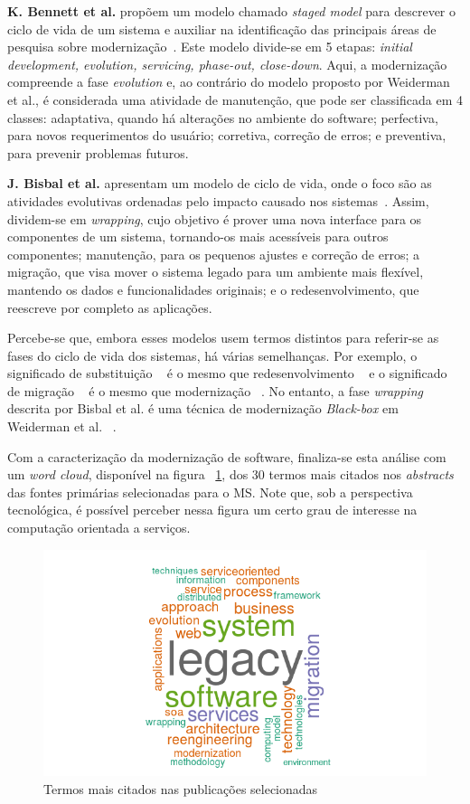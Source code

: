 \textbf{K. Bennett et al.} propõem um modelo chamado 
\textit{staged model} para descrever o ciclo de vida de um sistema e auxiliar na identificação das principais 
áreas de pesquisa sobre modernização~\cite{S01_bennett2000software}. Este modelo divide-se em 5 etapas: 
\textit{initial development, evolution, servicing, phase-out, close-down}. Aqui, a modernização compreende a fase \textit{evolution} e, 
ao contrário do modelo proposto por Weiderman et al., é considerada uma atividade de manutenção, que pode ser classificada em 
4 classes: adaptativa, quando há alterações no ambiente do software; perfectiva, para novos requerimentos do usuário; corretiva, correção de erros; e preventiva, para 
prevenir problemas futuros. 

\textbf{J. Bisbal et al.} apresentam um modelo de ciclo de vida, onde o foco são as atividades evolutivas ordenadas pelo impacto causado nos 
sistemas~\cite{S3_Bisbal:1999}. Assim, dividem-se em \textit{wrapping}, cujo objetivo é prover uma nova interface para os componentes de um sistema, 
tornando-os mais acessíveis para outros componentes; manutenção, para os pequenos ajustes e correção de erros; a migração, que visa mover o sistema 
legado para um ambiente mais flexível, mantendo os dados e funcionalidades originais; e o redesenvolvimento, que reescreve por completo as aplicações. 

Percebe-se que, embora esses modelos usem termos distintos para referir-se as fases do ciclo de vida dos sistemas, há várias semelhanças. Por exemplo, 
o significado de substituição ~\cite{S15_Comella-DordaASurvey2000, Seacord:2003, S12_WeidermanApproaches:1997} é o mesmo que redesenvolvimento ~\cite{S3_Bisbal:1999} e o significado de migração ~\cite{S3_Bisbal:1999} é o mesmo que modernização ~\cite{S15_Comella-DordaASurvey2000, Seacord:2003, S12_WeidermanApproaches:1997}. No entanto, 
a fase \textit{wrapping} descrita por Bisbal et al. é uma técnica de modernização \textit{Black-box} em Weiderman et al. ~\cite{S15_Comella-DordaASurvey2000, Seacord:2003, S12_WeidermanApproaches:1997}.

Com a caracterização da modernização de software, finaliza-se esta análise com um \textit{word cloud}, disponível na figura ~\ref{fig:word_cloud}, dos 30 termos mais citados nos \textit{abstracts} das fontes primárias selecionadas para o MS. Note que, sob a perspectiva tecnol\'{o}gica, \'{e} poss\'{i}vel perceber nessa figura um certo grau de interesse na computa\c c\~{a}o orientada a servi\c cos. 


\begin{figure}
\centering
\includegraphics[scale=0.5]{figuras/word_cloud.png}
\caption{Termos mais citados nas publicações selecionadas}
\label{fig:word_cloud}
\end{figure}
